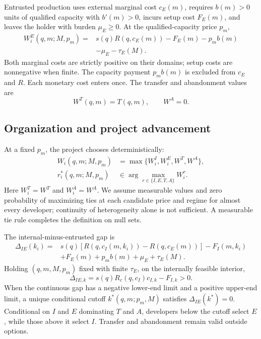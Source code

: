 \documentclass[11pt]{article}
\begin{document}
Entrusted production uses external marginal cost \(c_E(m)\), requires
\(b(m)>0\) units of qualified capacity with \(b'(m)>0\), incurs setup cost
\(F_E(m)\), and leaves the holder with burden \(\mu_E\geq0\). At the
qualified-capacity price \(p_m\),
\begin{equation}
  \begin{aligned}
  W_i^E(q,m;M,p_m)
  ={}&
  s(q)R\!\left(q,c_E(m)\right)-F_E(m)-p_mb(m)\\
  &-\mu_E-\tau_E(M).
  \end{aligned}
  \label{eq:p16m-entrusted}
\end{equation}
Both marginal costs are strictly positive on their domains; setup costs are
nonnegative when finite. The capacity payment \(p_mb(m)\) is excluded from
\(c_E\) and \(R\). Each monetary cost enters once. The transfer and abandonment values are
\begin{equation}
  W^T(q,m)=T(q,m),
  \qquad
  W^A=0.
  \label{eq:p16m-outside}
\end{equation}

\subsection{Organization and project advancement}
\label{subsec:p16m-organization}

At a fixed \(p_m\), the project chooses deterministically:
\begin{equation}
  \begin{aligned}
  W_i(q,m;M,p_m)
  &=
  \max\{W_i^I,W_i^E,W^T,W^A\},\\
  r_i^*(q,m;M,p_m)
  &\in
  \arg\max_{r\in\{I,E,T,A\}} W_i^r.
  \end{aligned}
  \label{eq:p16m-route-choice}
\end{equation}
Here \(W_i^T=W^T\) and \(W_i^A=W^A\). We assume measurable
values and zero probability of maximizing ties at each candidate price and
regime for almost every developer; continuity of heterogeneity alone is not
sufficient. A measurable tie rule completes the definition on null sets.

The internal-minus-entrusted gap is
\begin{equation}
  \begin{aligned}
  \Delta_{IE}(k_i)
  ={}&
  s(q)\!\left[
  R\!\left(q,c_I(m,k_i)\right)-R\!\left(q,c_E(m)\right)
  \right]-F_I(m,k_i)\\
  &+F_E(m)+p_mb(m)+\mu_E+\tau_E(M).
  \end{aligned}
  \label{eq:p16m-gap}
\end{equation}
Holding \((q,m,M,p_m)\) fixed with finite \(\tau_E\), on the internally feasible interior,
\[
  \Delta_{IE,k}
  =
  s(q)R_c\!\left(q,c_I\right)c_{I,k}-F_{I,k}>0.
\]
When the continuous gap has a negative lower-end limit and a positive
upper-end limit, a unique conditional cutoff
\(k^*(q,m;p_m,M)\) satisfies \(\Delta_{IE}(k^*)=0\). Conditional on \(I\)
and \(E\) dominating \(T\) and \(A\), developers below the cutoff select
\(E\), while those above it select \(I\). Transfer and abandonment remain
valid outside options.
\end{document}
